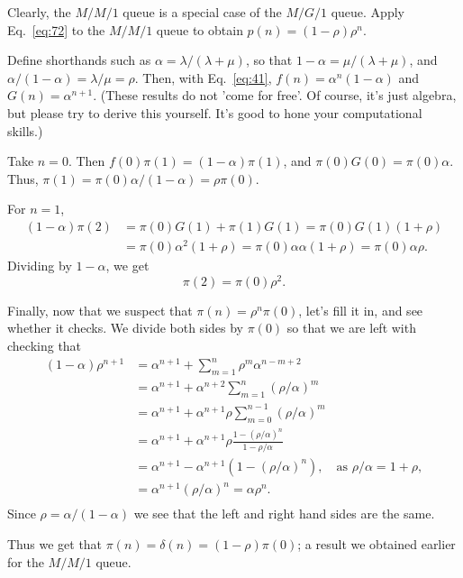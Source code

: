 \begin{exercise}
  Clearly, the $M/M/1$ queue is a special case of the $M/G/1$
  queue. Apply Eq.~\eqref{eq:72} to the $M/M/1$ queue to obtain $p(n)=(1-\rho)\rho^n$. 
  \begin{hint}
 Define shorthands
    such as $\alpha=\lambda/(\lambda+\mu)$, so that
    $1-\alpha = \mu/(\lambda+\mu)$, and
    $\alpha/(1-\alpha) = \lambda /\mu = \rho$.  Then, with Eq.~\ref{eq:41}, $f(n) = \alpha^n(1-\alpha)$ and $G(n) = \alpha^{n+1}$.  (These results do not 'come for
    free'. Of course, it's just algebra, but please try to derive this
    yourself. It's good to hone your computational skills.)
  \end{hint}
    \begin{solution}
      Take $n=0$. Then $f(0) \pi(1) = (1-\alpha)\pi(1)$, and
      $\pi(0)G(0) = \pi(0)\alpha$. Thus,
      $\pi(1) = \pi(0)\alpha/(1-\alpha) = \rho \pi(0)$. 

For $n=1$,
\begin{equation*}
  \begin{split}
  (1-\alpha)  \pi(2) 
&= \pi(0)G(1) + \pi(1)G(1) = \pi(0)G(1)(1+\rho) \\
&= \pi(0)\alpha^2(1+\rho) = \pi(0)\alpha \alpha (1+\rho) = \pi(0)\alpha \rho.
  \end{split}
\end{equation*}
Dividing by $1-\alpha$, we get
\begin{equation*}
  \pi(2) = \pi(0)\rho^2.
\end{equation*}

Finally, now that we suspect that $\pi(n) = \rho^n \pi(0)$, let's fill
it in, and see whether it checks. We divide both sides by $\pi(0)$ so
that we are left with checking that
\begin{align*}
    (1-\alpha)\rho^{n+1} 
&= \alpha^{n+1} + \sum_{m=1}^n \rho^m \alpha^{n-m+2}  \\
&= \alpha^{n+1} + \alpha^{n+2}\sum_{m=1}^n (\rho/\alpha)^m  \\
&= \alpha^{n+1} + \alpha^{n+1}\rho \sum_{m=0}^{n-1} (\rho/\alpha)^m \\
&= \alpha^{n+1} + \alpha^{n+1}\rho \frac{1-(\rho/\alpha)^n}{1-\rho/\alpha}\\
&= \alpha^{n+1} - \alpha^{n+1}(1-(\rho/\alpha)^n), \quad\text{as } \rho/\alpha = 1+\rho,\\
&= \alpha^{n+1}(\rho/\alpha)^n = \alpha \rho^n.\\
\end{align*}
Since $\rho=\alpha/(1-\alpha)$ we see that the left and right hand sides are the same. 

Thus we get that $\pi(n) = \delta(n) = (1-\rho) \pi(0)$; a result we
obtained earlier for the $M/M/1$ queue.
\end{solution}
\end{exercise}


